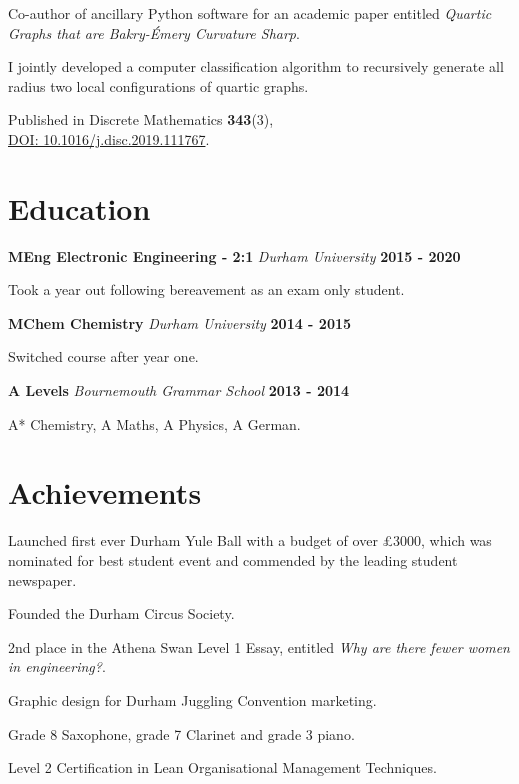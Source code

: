 \documentclass[a4paper, 11pt, hidelinks]{article}
\newcommand{\xp}[3]{
	\vspace{0.25em}
	\textbf{\large#1} \quad \emph{\large#2} \hfill \textbf{\large#3}
}
\begin{document}
\begin{minipage}{0.587\textwidth}
\begin{itemise}
			\item Co-author of ancillary Python software for an academic paper entitled \emph{Quartic Graphs that are Bakry-Émery Curvature Sharp}.
			\item I jointly developed a computer classification algorithm to recursively generate all radius two local configurations of quartic graphs.
			\item Published in Discrete Mathematics \textbf{343}(3),\\ \href{https://arxiv.org/abs/1902.10665}{DOI: 10.1016/j.disc.2019.111767}.
			\hfill
			\href{https://www.francisgurr.com/pages/summer_project/summer_project.html}{\faExternalLink}
		\end{itemise}
		
		\section{Education}
		\xp{MEng Electronic Engineering - 2:1}{Durham University}{2015 - 2020}
		\begin{itemise}
			\item Took a year out following bereavement as an exam only student.
		\end{itemise}
		\xp{MChem Chemistry}{Durham University}{2014 - 2015}
		\begin{itemise}
			\item Switched course after year one.
		\end{itemise}
		\xp{A Levels}{Bournemouth Grammar School}{2013 - 2014}
		\begin{itemise}
			\item A* Chemistry, A Maths, A Physics, A German.
		\end{itemise}
		
		\section{Achievements}
		\begin{itemise}[1em][-0.25em][0em][0em]
			\item Launched first ever Durham Yule Ball with a budget of over £3000, which was nominated for best student event and commended by the leading student newspaper.
			\hfill \href{https://www.palatinate.org.uk/things-you-need-to-do-in-durham-before-graduating/}{\faExternalLink}
			\item Founded the Durham Circus Society.
			\item 2nd place in the Athena Swan Level 1 Essay, entitled \emph{Why are there fewer women in engineering?}.
			\hfill \href{https://www.dur.ac.uk/experience/news/?itemno=27469}{\faExternalLink}
			\item Graphic design for Durham Juggling Convention marketing.
			\item Grade 8 Saxophone, grade 7 Clarinet and grade 3 piano.
			\item Level 2 Certification in Lean Organisational Management Techniques.
		\end{itemise}
	\end{minipage}
\end{document}
